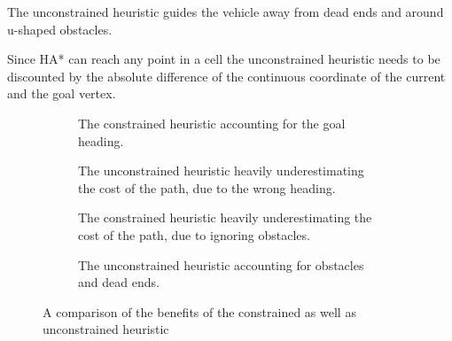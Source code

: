 The unconstrained heuristic guides the vehicle away from dead ends and around u-shaped obstacles.

Since HA* can reach any point in a cell the unconstrained heuristic needs to be discounted by the absolute difference of the continuous coordinate of the current and the goal vertex.

\begin{figure}[h]
    \centering
    \begin{subfigure}[t]{0.45\textwidth}
        \caption{The constrained heuristic accounting for the goal heading.}
        \label{fig:constrainedGood}
    \end{subfigure}
    \hfill
    \begin{subfigure}[t]{0.45\textwidth}
        \caption{The unconstrained heuristic heavily underestimating the cost of the path, due to the wrong heading.}
        \label{fig:unconstrainedBad}
    \end{subfigure}
        \begin{subfigure}[t]{0.45\textwidth}
        \caption{The constrained heuristic heavily underestimating the cost of the path, due to ignoring obstacles.}
        \label{fig:constrainedBad}
    \end{subfigure}
    \hfill
    \begin{subfigure}[t]{0.45\textwidth}
        \caption{The unconstrained heuristic accounting for obstacles and dead ends.}
        \label{fig:unconstrainedGood}
    \end{subfigure}
    \caption[A heuristic comparison]{A comparison of the benefits of the constrained as well as unconstrained heuristic}
    \label{fig:heuristicComparison}
\end{figure}